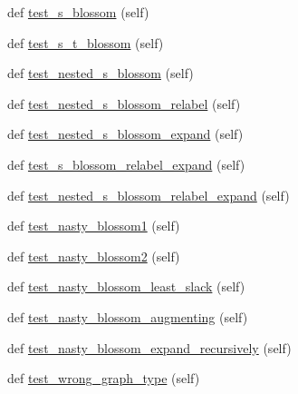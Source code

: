 \begin{DoxyCompactItemize}
def \hyperlink{classnetworkx_1_1algorithms_1_1tests_1_1test__matching_1_1TestMaxWeightMatching_a6e4901f61853b01369fc89b39c9d9966}{test\+\_\+s\+\_\+blossom} (self)
\item 
def \hyperlink{classnetworkx_1_1algorithms_1_1tests_1_1test__matching_1_1TestMaxWeightMatching_ab1e0203e26a158279a5f9d136ff4cbc2}{test\+\_\+s\+\_\+t\+\_\+blossom} (self)
\item 
def \hyperlink{classnetworkx_1_1algorithms_1_1tests_1_1test__matching_1_1TestMaxWeightMatching_a80d7ee20d17d63bbfa1054870df7ef0d}{test\+\_\+nested\+\_\+s\+\_\+blossom} (self)
\item 
def \hyperlink{classnetworkx_1_1algorithms_1_1tests_1_1test__matching_1_1TestMaxWeightMatching_aa85422e9993e80d179c02964c2c98e3e}{test\+\_\+nested\+\_\+s\+\_\+blossom\+\_\+relabel} (self)
\item 
def \hyperlink{classnetworkx_1_1algorithms_1_1tests_1_1test__matching_1_1TestMaxWeightMatching_a6681d9130ddb57c2793fd56700c5ca0c}{test\+\_\+nested\+\_\+s\+\_\+blossom\+\_\+expand} (self)
\item 
def \hyperlink{classnetworkx_1_1algorithms_1_1tests_1_1test__matching_1_1TestMaxWeightMatching_a38f820ee992ee0f1349952e7c7c32bbb}{test\+\_\+s\+\_\+blossom\+\_\+relabel\+\_\+expand} (self)
\item 
def \hyperlink{classnetworkx_1_1algorithms_1_1tests_1_1test__matching_1_1TestMaxWeightMatching_a342bc8835cb87ec4f61e0ab6ff1ae939}{test\+\_\+nested\+\_\+s\+\_\+blossom\+\_\+relabel\+\_\+expand} (self)
\item 
def \hyperlink{classnetworkx_1_1algorithms_1_1tests_1_1test__matching_1_1TestMaxWeightMatching_acd81709505e6a89befafe588e7b490c1}{test\+\_\+nasty\+\_\+blossom1} (self)
\item 
def \hyperlink{classnetworkx_1_1algorithms_1_1tests_1_1test__matching_1_1TestMaxWeightMatching_a9e004d22f4e149e17232b37bf56d6f85}{test\+\_\+nasty\+\_\+blossom2} (self)
\item 
def \hyperlink{classnetworkx_1_1algorithms_1_1tests_1_1test__matching_1_1TestMaxWeightMatching_af293656f6f925e9890a913e0324114b2}{test\+\_\+nasty\+\_\+blossom\+\_\+least\+\_\+slack} (self)
\item 
def \hyperlink{classnetworkx_1_1algorithms_1_1tests_1_1test__matching_1_1TestMaxWeightMatching_a61db2fdc3ed5ca42f24a16d79d55c9d0}{test\+\_\+nasty\+\_\+blossom\+\_\+augmenting} (self)
\item 
def \hyperlink{classnetworkx_1_1algorithms_1_1tests_1_1test__matching_1_1TestMaxWeightMatching_a88eced46a92ddbd3b0b18890498d0019}{test\+\_\+nasty\+\_\+blossom\+\_\+expand\+\_\+recursively} (self)
\item 
def \hyperlink{classnetworkx_1_1algorithms_1_1tests_1_1test__matching_1_1TestMaxWeightMatching_a1cad973fd21343081f421a09058d70e4}{test\+\_\+wrong\+\_\+graph\+\_\+type} (self)
\end{DoxyCompactItemize}


